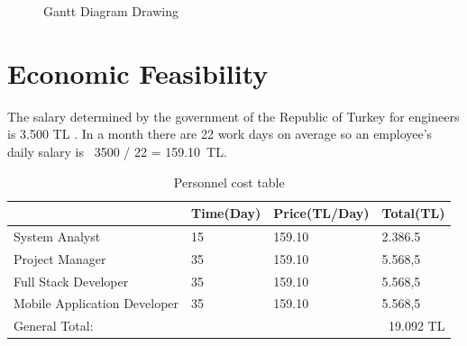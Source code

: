 \begin{figure}[!htbp]
\caption{Gantt Diagram Drawing}
\label{fig:ganttDeneme}
\end{figure}

\newpage
\section{Economic Feasibility}
The salary determined by the government of the Republic of Turkey for engineers
is 3.500 TL \cite{muhendisMaas}. In a month there are 22 work days on average so an employee's daily salary is \ 3500 / 22 = 159.10\ TL.

\begin{table}[!h!]
\centering
\caption{Personnel cost table}
\label{tab:maas}
\begin{tabular}{|l|l|l|l|}
\hline
& \multicolumn{1}{l|}{\textbf{Time(Day)}} & \multicolumn{1}{l|}{\textbf{Price(TL/Day)}} & \multicolumn{1}{l|}{\textbf{Total(TL)}} \\ \hline
System Analyst   & 15                                      & 159.10                                      & 2.386.5                                 \\ \hline
Project Manager      & 35                                      & 159.10                                      & 5.568,5                                 \\ \hline
Full Stack Developer     & 35                                      & 159.10                                      & 5.568,5                                 \\ \hline
Mobile Application Developer & 35                                       & 159.10                                      & 5.568,5                                  \\ \hline
General Total:      & \multicolumn{3}{r|}{19.092 TL}                                                                                                  \\ \hline
\end{tabular}
\end{table}

